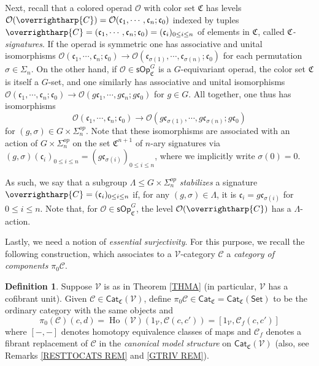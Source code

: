 \documentclass[a4paper,10pt
 ,final
]{article}%
\numberwithin{equation}{section}
\numberwithin{figure}{section}
\theoremstyle{definition} %
\newtheorem{definition}[equation]{Definition}%
\newcommand{\vect}[1]{\text{\overrightharp{\ensuremath{#1}}}}
\newcommand{\Cat}{\mathsf{Cat}}
\DeclareMathOperator{\Ho}{Ho}
\newcommand{\V}{\ensuremath{\mathcal V}}
\renewcommand{\O}{\ensuremath{\mathcal O}}
\newcommand{\1}{\ensuremath{\mathbbm 1}}%
\begin{document}
Next, recall that a colored operad $\O$	
with color set $\mathfrak{C}$ has levels 	
$	
\O(\vect{C})=	
\O(\mathfrak{c}_1,\cdots,\mathfrak{c}_n;\mathfrak{c}_0)$	
indexed by tuples	
$\vect{C} = (\mathfrak{c}_1,\cdots,\mathfrak{c}_n;\mathfrak{c}_0) = (\mathfrak c_i)_{0 \leq i \leq n}$	
of elements in $\mathfrak{C}$, called \emph{$\mathfrak{C}$-signatures}.	
If the operad is symmetric one has associative and unital isomorphisms	
$	
\O(\mathfrak{c}_1,\cdots,\mathfrak{c}_n;\mathfrak{c}_0) \to 	
\O(\mathfrak{c}_{\sigma(1)},\cdots,\mathfrak{c}_{\sigma(n)};\mathfrak{c}_0)	
$	
for each permutation $\sigma \in \Sigma_n$.	
On the other hand, if 	
$\O \in \mathsf{sOp}^G_{\mathfrak{C}}$	
is a $G$-equivariant operad, 	
the color set $\mathfrak{C}$ is itself a $G$-set,	
and one similarly has associative and unital isomorphisms	
$	
\O(\mathfrak{c}_1,\cdots,\mathfrak{c}_n;\mathfrak{c}_0) \to 	
\O(g\mathfrak{c}_{1},\cdots,g\mathfrak{c}_{n};g\mathfrak{c}_0)	
$ for $g \in G$.
All together, one thus has isomorphisms	
\begin{equation}\label{OPSSYMS EQ}	
\O(\mathfrak{c}_1,\cdots,\mathfrak{c}_n;\mathfrak{c}_0)	
\to 	
\O(g \mathfrak{c}_{\sigma(1)},\cdots,g \mathfrak{c}_{\sigma(n)};g\mathfrak{c}_0)	
\end{equation}	
for $(g,\sigma) \in G \times \Sigma_n^{op}$.	
Note that these isomorphisms 	
are associated with an action of 	
$G \times \Sigma_n^{op}$	
on the set $\mathfrak{C}^{n+1}$ of $n$-ary signatures via	
$(g,\sigma) (\mathfrak{c}_i)_{0\leq i \leq n}	
= (g \mathfrak{c}_{\sigma(i)})_{0\leq i \leq n}$,	
where we implicitly write $\sigma(0)=0$.

As such, we say that a subgroup 	
$\Lambda \leq G \times \Sigma_n^{op}$	
\emph{stabilizes} a signature $\vect{C}=(\mathfrak{c}_i)_{0 \leq i \leq n}$ if,	
for any $(g,\sigma) \in \Lambda$,	
it is 	
$\mathfrak{c}_i = g \mathfrak{c}_{\sigma(i)}$ for $0 \leq i \leq n$.	
Note that,	
for $\O \in \mathsf{sOp}^G_{\mathfrak{C}}$,	
the level $\O(\vect{C})$ has a $\Lambda$-action.




Lastly, we need a notion of 
\emph{essential surjectivity}.
For this purpose, we recall the following construction, 
which associates to a $\V$-category $\mathcal{C}$
a \emph{category of components} $\pi_0 \mathcal{C}$.



\begin{definition}
	Suppose $\V$ is as in Theorem \ref{THMA}
	(in particular, $\V$ has a cofibrant unit).
	Given $\mathcal C \in \Cat_{\mathfrak{C}}(\V)$, 
	define 
	$\pi_0 \mathcal C \in \Cat_{\mathfrak{C}} = \Cat_{\mathfrak{C}}(\mathsf{Set})$ 
	to be the ordinary category with the same objects and
        \[
                \pi_0(\mathcal{C})(c,d)=
                \Ho(\V)(1_\V, \mathcal C(c,c'))=
                [1_\V, \mathcal{C}_f(c,c')]
        \]
        where $[-,-]$ denotes homotopy equivalence classes of maps
        and $\mathcal{C}_f$ denotes a fibrant replacement of
        $\mathcal C$ in the \emph{canonical model structure} on $\Cat_{\mathfrak{C}}(\V)$
        \cite{BM13} (also, see Remarks 
        \ref{RESTTOCATS REM} and \ref{GTRIV REM}).
\end{definition}
\end{document}
